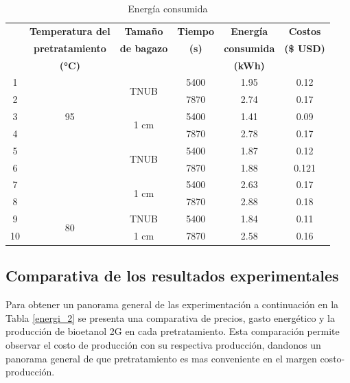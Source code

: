 \documentclass[12pt]{article}
\begin{document}
	
	\begin{table}[H]
		\centering
		\label{energi_}
		\caption{Energía consumida }
		{\fontsize{9}{10.8}\selectfont
			\begin{tabular}{|c|c|c|c|c|c|}
				\hline
				&\textbf{Temperatura del} & \textbf{Tamaño } & \textbf{Tiempo} & \textbf{Energía } & \textbf{Costos } \\ 
				&\textbf{pretratamiento} &	\textbf{ de bagazo}  &	\textbf{ (s)} & 	\textbf{consumida  }& 	\textbf{(\$ USD)} \\ 
				&\textbf{(°C)}  &  &  & \textbf{(kWh)} &  \\ \hline
			1	&\multirow{5}{*}{95} &\multirow{2}{*}{ TNUB} & 5400 & 1.95 & 0.12 \\ \cline{4-6}\cline{1-1}
			2	&&  & 7870& 2.74 & 0.17  \\ \cline{3-6}\cline{1-1}
		3	&	& \multirow{2}{*}{ 1 cm}& 5400  & 1.41 & 0.09  \\ \cline{4-6}\cline{1-1}
		4	&	&   & 7870 & 2.78 & 0.17  \\ \hline
		5	&	\multirow{5}{*}{90}	 & \multirow{2}{*}{TNUB} & 5400 & 1.87 & 0.12 \\ \cline{4-6}\cline{1-1}
		6	&	 &  & 7870 & 1.88 & 0.121 \\ \cline{3-6}\cline{1-1}
		7	&	 & \multirow{2}{*}{1 cm} & 5400 & 2.63 & 0.17 \\ \cline{4-6}\cline{1-1}
		8	&	& & 7870 & 2.88 & 0.18  \\ \hline
	9	&		\multirow{2}{*}{80}	 & TNUB & 5400 & 1.84 &0.11   \\ \cline{3-6}\cline{1-1}
		10	&	 & 1 cm & 7870 & 2.58 & 0.16 \\ \hline
		\end{tabular}}
		
	\end{table}
	
	
	
	
	
		\subsection{Comparativa de los resultados experimentales}
	
	Para obtener un panorama general de las experimentación a continuación en la Tabla \ref{energi_2} se presenta una comparativa de precios, gasto energético y la producción de bioetanol 2G en cada pretratamiento. Esta comparación permite observar el costo de producción con su respectiva producción, dandonos un panorama general de que pretratamiento es mas conveniente en el margen costo-producción.
	
\end{document}
